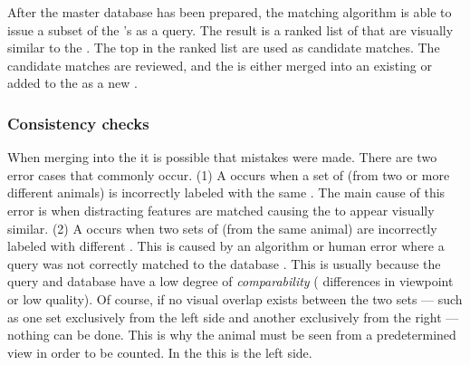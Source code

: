             After the master database has been prepared, the matching
              algorithm is able to issue a subset of the \encounter{}'s
              \annots{} as a query.
            The result is a ranked list of \exemplars{} that are
              visually similar to the \encounter{}.
            The top \exemplars{} in the ranked list are used as
              candidate matches.
            The candidate matches are reviewed, and the \encounter{} is
              either merged into an existing \mastername{} or added to
              the \masterdatabase{} as a new \mastername{}.

        \subsubsection{Consistency checks}
            When merging \encounters{} into the \masterdatabase{} it is
              possible that mistakes were made.
            There are two error cases that commonly occur.
            (1) A  occurs when a set of
              \annots{} (from two or more different animals) is
              incorrectly labeled with the same \name{}.
            The main cause of this error is when distracting features
              are matched causing the \annots{} to appear visually
              similar.
            (2) A  occurs when two sets of
              \annots{} (from the same animal) are incorrectly labeled
              with different \names{}.
            This is caused by an algorithm or human error where a query
              \encounter{} was not correctly matched to the database
              \exemplars{}.
            This is usually because the query and database \annots{}
              have a low degree of \emph{comparability} (\eg{}
              differences in viewpoint or low quality).
            Of course, if no visual overlap exists between the two sets
              --- such as one set exclusively from the left side and
              another exclusively from the right --- nothing can be done.
            This is why the animal must be seen from a predetermined
              view in order to be counted.
            In the \GZC{} this is the left side.

